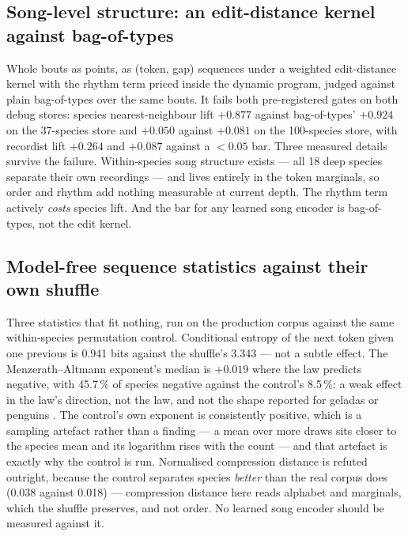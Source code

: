 \documentclass[10pt,twocolumn,a4paper]{article}
\begin{document}
\subsection{Song-level structure: an edit-distance kernel against bag-of-types}

Whole bouts as points, as (token, gap) sequences under a weighted edit-distance kernel with
the rhythm term priced inside the dynamic program, judged against plain bag-of-types over
the same bouts. It fails both pre-registered gates on both debug stores: species
nearest-neighbour lift $+0.877$ against bag-of-types' $+0.924$ on the 37-species store and
$+0.050$ against $+0.081$ on the 100-species store, with recordist lift $+0.264$ and
$+0.087$ against a $<0.05$ bar. Three measured details survive the failure. Within-species
song structure exists --- all 18 deep species separate their own recordings --- and lives
entirely in the token marginals, so order and rhythm add nothing measurable at current
depth. The rhythm term actively \emph{costs} species lift. And the bar for any learned song
encoder is bag-of-types, not the edit kernel.

\subsection{Model-free sequence statistics against their own shuffle}

Three statistics that fit nothing, run on the production corpus against the same
within-species permutation control. Conditional entropy of the next token given one previous
is 0.941 bits against the shuffle's 3.343 --- not a subtle effect. The Menzerath--Altmann
exponent's median is $+0.019$ where the law predicts negative, with 45.7\,\% of species
negative against the control's 8.5\,\%: a weak effect in the law's direction, not the law, and
not the shape reported for geladas or penguins \citep{gustison2016,favaro2020}. The control's
own exponent is consistently positive, which is a sampling artefact rather than a finding --- a
mean over more draws sits closer to the species mean and its logarithm rises with the count ---
and that artefact is exactly why the control is run.
Normalised compression distance \citep{cilibrasi2005} is refuted outright, because the control
separates species \emph{better} than the real corpus does (0.038 against 0.018) ---
compression distance here reads alphabet and marginals, which the shuffle preserves, and
not order. No learned song encoder should be measured against it.
\end{document}

